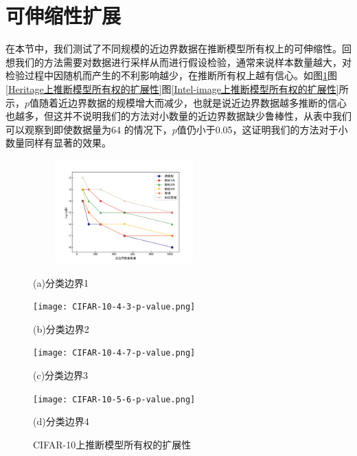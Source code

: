 \section{可伸缩性扩展}\label{5.6}

在本节中，我们测试了不同规模的近边界数据在推断模型所有权上的可伸缩性。回想我们的方法需要对数据进行采样从而进行假设检验，通常来说样本数量越大，对检验过程中因随机而产生的不利影响越少，在推断所有权上越有信心。如图\ref{CIFAR-10上推断模型所有权的扩展性}图\ref{Heritage上推断模型所有权的扩展性}图\ref{Intel-image上推断模型所有权的扩展性}所示，$p$值随着近边界数据的规模增大而减少，也就是说近边界数据越多推断的信心也越多，但这并不说明我们的方法对小数量的近边界数据缺少鲁棒性，从表中我们可以观察到即使数据量为64 的情况下，$p$值仍小于0.05，这证明我们的方法对于小数量同样有显著的效果。

\begin{figure}[htbp]%
	\centering
	\begin{minipage}[htbp]{0.49\linewidth}        %
		\hspace{2mm}
		\centering
		\includegraphics[width=7cm,height=4cm]{CIFAR-10-4-2-p-value.png}
		\centerline{(a)分类边界1}
	\end{minipage}
	\begin{minipage}[htbp]{0.49\linewidth}        %
		\hspace{2mm}
		\centering
		\texttt{[image: CIFAR-10-4-3-p-value.png]}
		\centerline{(b)分类边界2}
	\end{minipage}
	\begin{minipage}[htbp]{0.49\linewidth}        %
		\hspace{2mm}
		\centering
		\texttt{[image: CIFAR-10-4-7-p-value.png]}
		\centerline{(c)分类边界3}
	\end{minipage}
	\begin{minipage}[htbp]{0.49\linewidth}        %
		\hspace{2mm}
		\centering
		\texttt{[image: CIFAR-10-5-6-p-value.png]}
		\centerline{(d)分类边界4}
	\end{minipage}
\setlength{\abovecaptionskip}{7mm} %
\caption{CIFAR-10上推断模型所有权的扩展性}
\label{CIFAR-10上推断模型所有权的扩展性}
\end {figure}
	
